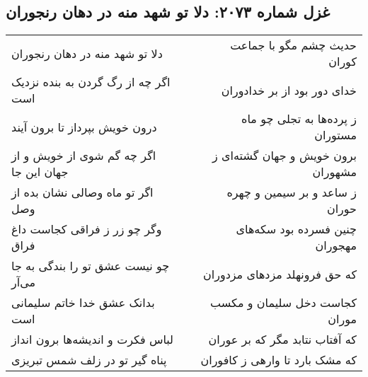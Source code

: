 \begin{center}
\section*{غزل شماره ۲۰۷۳: دلا تو شهد منه در دهان رنجوران}
\label{sec:2073}
\begin{longtable}{l p{0.5cm} r}
دلا تو شهد منه در دهان رنجوران
&&
حدیث چشم مگو با جماعت کوران
\\
اگر چه از رگ گردن به بنده نزدیک است
&&
خدای دور بود از بر خدادوران
\\
درون خویش بپرداز تا برون آیند
&&
ز پرده‌ها به تجلی چو ماه مستوران
\\
اگر چه گم شوی از خویش و از جهان این جا
&&
برون خویش و جهان گشته‌ای ز مشهوران
\\
اگر تو ماه وصالی نشان بده از وصل
&&
ز ساعد و بر سیمین و چهره حوران
\\
وگر چو زر ز فراقی کجاست داغ فراق
&&
چنین فسرده بود سکه‌های مهجوران
\\
چو نیست عشق تو را بندگی به جا می‌آر
&&
که حق فرونهلد مزدهای مزدوران
\\
بدانک عشق خدا خاتم سلیمانی است
&&
کجاست دخل سلیمان و مکسب موران
\\
لباس فکرت و اندیشه‌ها برون انداز
&&
که آفتاب نتابد مگر که بر عوران
\\
پناه گیر تو در زلف شمس تبریزی
&&
که مشک بارد تا وارهی ز کافوران
\\
\end{longtable}
\end{center}
